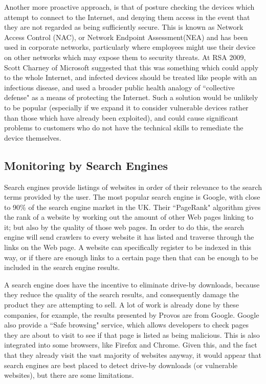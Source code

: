 \documentclass{acm_proc_article-sp}
\begin{document}
Another more proactive approach, is that of posture checking the devices which attempt to connect to the Internet, and denying them access in the event that they are not regarded as being sufficiently secure.  This is known as Network Access Control (NAC), or Network Endpoint Assessment(NEA) and has been used in corporate networks, particularly where employees might use their device on other networks which may expose them to security threats.  At RSA 2009, Scott Charney of Microsoft suggested that this was something which could apply to the whole Internet, and infected devices should be treated like people with an infectious disease, and used a broader public health analogy of ``collective defense" as a means of protecting the Internet.  Such a solution would be unlikely to be popular (especially if we expand it to consider vulnerable devices rather than those which have already been exploited), and could cause significant problems to customers who do not have the technical skills to remediate the device themselves.  

\subsection{Monitoring by Search Engines}
Search engines provide listings of websites in order of their relevance to the search terms provided by the user.  The most popular search engine is Google, with close to 90\% of the search engine market in the UK.  Their ``PageRank" algorithm gives the rank of a website by working out the amount of other Web pages linking to it; but also by the quality of those web pages.  In order to do this, the search engine will send crawlers to every website it has listed and traverse through the links on the Web page.  A website can specifically register to be indexed in this way, or if there are enough links to a certain page then that can be enough to be included in the search engine results.

A search engine does have the incentive to eliminate drive-by downloads, because they reduce the quality of the search results, and consequently damage the product they are attempting to sell\cite{edwards2012}.  A lot of work is already done by these companies, for example, the results presented by Provos\cite{provos} are from Google.  Google also provide a ``Safe browsing" service, which allows developers to check pages they are about to visit to see if that page is listed as being malicious.  This is also integrated into some browsers, like Firefox and Chrome.  Given this, and the fact that they already visit the vast majority of websites anyway, it would appear that search engines are best placed to detect drive-by downloads (or vulnerable websites), but there are some limitations.
\end{document}
